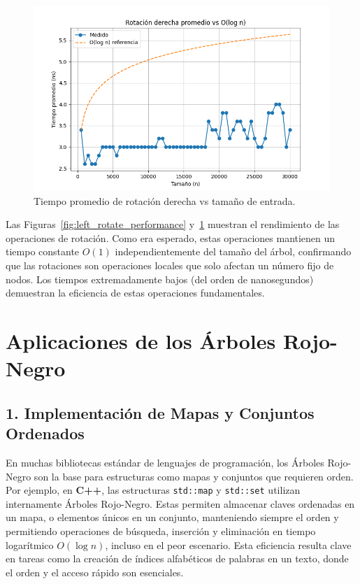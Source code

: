 \documentclass[conference]{IEEEtran}
\begin{document}
\begin{figure}[H]
    \centering
    \includegraphics[width=0.9\columnwidth]{right_rotate.png}
    \caption{Tiempo promedio de rotación derecha vs tamaño de entrada.}
    \label{fig:right_rotate_performance}
\end{figure}

Las Figuras~\ref{fig:left_rotate_performance} y~\ref{fig:right_rotate_performance} muestran el rendimiento de las operaciones de rotación. Como era esperado, estas operaciones mantienen un tiempo constante $O(1)$ independientemente del tamaño del árbol, confirmando que las rotaciones son operaciones locales que solo afectan un número fijo de nodos. Los tiempos extremadamente bajos (del orden de nanosegundos) demuestran la eficiencia de estas operaciones fundamentales.







\section{Aplicaciones de los Árboles Rojo-Negro}

\subsection*{1. Implementación de Mapas y Conjuntos Ordenados}

En muchas bibliotecas estándar de lenguajes de programación, los Árboles Rojo-Negro son la base para estructuras como mapas y conjuntos que requieren orden.  
Por ejemplo, en \textbf{C++}, las estructuras \texttt{std::map} y \texttt{std::set} utilizan internamente Árboles Rojo-Negro. Estas permiten almacenar claves ordenadas en un mapa, o elementos únicos en un conjunto, manteniendo siempre el orden y permitiendo operaciones de búsqueda, inserción y eliminación en tiempo logarítmico \(O(\log n)\), incluso en el peor escenario. Esta eficiencia resulta clave en tareas como la creación de índices alfabéticos de palabras en un texto, donde el orden y el acceso rápido son esenciales.
\end{document}
